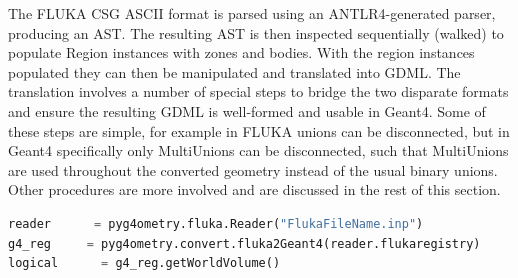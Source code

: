 \documentclass[final,5p,times,twocolumn]{elsarticle}
\newcommand{\PYGEOMETRY}{\textsc{Pyg4ometry}}
\begin{document}
The FLUKA CSG ASCII format is parsed using an ANTLR4-generated parser,
producing an AST.  The resulting AST is then inspected sequentially (walked)
to populate Region instances with zones and bodies.  With the region
instances populated they can then be manipulated and translated into GDML.
The translation involves a number of special steps to bridge the two
disparate formats and ensure the resulting GDML is well-formed and usable
in Geant4.  Some of these steps are simple, for example in FLUKA unions can
be disconnected, but in Geant4 specifically only MultiUnions can be
disconnected, such that MultiUnions are used throughout the converted
geometry instead of the usual binary unions.  Other procedures are more
involved and are discussed in the rest of this section.

\begin{lstlisting}[caption={A simple \PYGEOMETRY{} Python script to load a FLUKA file.},label={lst:pythonFlukaLoading}, language=Python]
reader      = pyg4ometry.fluka.Reader("FlukaFileName.inp")
g4_reg     = pyg4ometry.convert.fluka2Geant4(reader.flukaregistry)
logical      = g4_reg.getWorldVolume()
\end{lstlisting}
\end{document}
